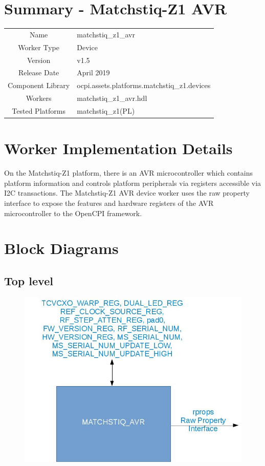 \documentclass{article}
\author{} %
\date{Version \docVersion} %
\title{\docTitle}
\def\docVersion{1.5}
\def\comp{matchstiq\_z1\_avr}
\def\Comp{Matchstiq-Z1 AVR}
\begin{document}
\section*{Summary - \Comp}
\begin{tabular}{|c|M{13.5cm}|}
	\hline
	                  &                                        			\\
	\hline
	Name              & \comp                                  			\\
	\hline
	Worker Type       & Device                                 			\\
	\hline
	Version           & v\docVersion \\
	\hline
	Release Date      & April 2019 \\
	\hline
	Component Library & ocpi.assets.platforms.matchstiq\_z1.devices		\\
	\hline
	Workers           & \comp.hdl                              			\\
	\hline
	Tested Platforms  & matchstiq\_z1(PL)                       			\\
	\hline
\end{tabular}

\section*{Worker Implementation Details}
On the Matchstiq-Z1 platform, there is an AVR microcontroller which contains platform information and controls platform peripherals via registers accessible via I2C transactions. The \Comp{} device worker uses the raw property interface to expose the features and hardware registers of the AVR microcontroller to the OpenCPI framework.

\section*{Block Diagrams}
\subsection*{Top level}
\begin{figure}[ht]
	\centerline{\includegraphics[scale=0.4]{matchstiq_z1_avr_top_level}}
	\label{fig:tb}
\end{figure}
\end{document}
